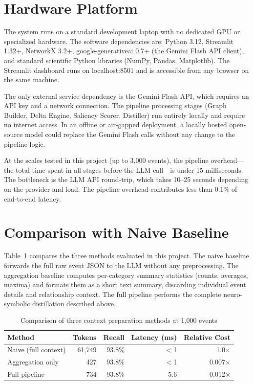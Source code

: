 \section{Hardware Platform}
\label{sec:hardware}

The system runs on a standard development laptop with no dedicated GPU or specialized
hardware. The software dependencies are: Python 3.12, Streamlit 1.32+, NetworkX 3.2+,
google-generativeai 0.7+ (the Gemini Flash API client), and standard scientific Python
libraries (NumPy, Pandas, Matplotlib). The Streamlit dashboard runs on localhost:8501 and
is accessible from any browser on the same machine.

The only external service dependency is the Gemini Flash API, which requires an API key
and a network connection. The pipeline processing stages (Graph Builder, Delta Engine,
Saliency Scorer, Distiller) run entirely locally and require no internet access. In an
offline or air-gapped deployment, a locally hosted open-source model could replace the
Gemini Flash calls without any change to the pipeline logic.

At the scales tested in this project (up to 3,000 events), the pipeline overhead---the
total time spent in all stages before the LLM call---is under 15 milliseconds. The
bottleneck is the LLM API round-trip, which takes 10--25 seconds depending on the
provider and load. The pipeline overhead contributes less than 0.1\% of end-to-end latency.

\section{Comparison with Naive Baseline}
\label{sec:comparison_baseline}

Table~\ref{tab:method_comparison} compares the three methods evaluated in this project.
The naive baseline forwards the full raw event JSON to the LLM without any preprocessing.
The aggregation baseline computes per-category summary statistics (counts, averages, maxima)
and formats them as a short text summary, discarding individual event details and
relationship context. The full pipeline performs the complete neuro-symbolic distillation
described above.

\begin{table}[H]
\centering
\caption{Comparison of three context preparation methods at 1,000 events}
\label{tab:method_comparison}
\begin{tabular}{lrrrr}
\toprule
\textbf{Method} & \textbf{Tokens} & \textbf{Recall} & \textbf{Latency (ms)} & \textbf{Relative Cost} \\
\midrule
Naive (full context) & 61,749 & 93.8\% & $<$1 & 1.0$\times$ \\
Aggregation only     & 427    & 93.8\% & $<$1 & 0.007$\times$ \\
Full pipeline        & 734    & 93.8\% & 5.6  & 0.012$\times$ \\
\bottomrule
\end{tabular}
\end{table}

